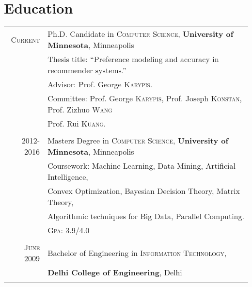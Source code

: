 \documentclass[a4paper,10pt]{article}
\begin{document}
\section{Education}
\begin{tabular}{r|l}	
 \textsc{Current}  & Ph.D. Candidate in \textsc{Computer Science},
  \textbf{University of Minnesota}, Minneapolis\\
 & Thesis title: ``Preference modeling and accuracy in
  recommender systems.''\\
  & \small Advisor: Prof. George \textsc{Karypis}. \\
  & \small Committee: Prof. George \textsc{Karypis}, Prof. Joseph
  \textsc{Konstan},  Prof. Zizhuo \textsc{Wang} \\
  & \small Prof. Rui \textsc{Kuang}. \\
  \multicolumn{2}{c}{}\\

  \textsc{2012-2016} & Masters Degree in \textsc{Computer Science},
  \textbf{University of Minnesota}, Minneapolis \\
                     &Coursework: Machine Learning, Data Mining, Artificial
  Intelligence,  \\
                   &Convex Optimization, Bayesian Decision Theory, Matrix
  Theory, \\ 
  &Algorithmic techniques for Big Data, Parallel Computing. \\
                     &\normalsize \textsc{Gpa}: 3.9/4.0 \\
                   \multicolumn{2}{c}{}\\ %

   
   \textsc{June} 2009& Bachelor of Engineering in \textsc{Information
      Technology}, \\
      &\textbf{Delhi College of Engineering}, Delhi\\
\multicolumn{2}{c}{}\\
\end{tabular}
\end{document}
